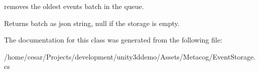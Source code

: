 removes the oldest events batch in the queue. 

\begin{DoxyReturn}{Returns}
batch as json string, null if the storage is empty.
\end{DoxyReturn}


The documentation for this class was generated from the following file\+:\begin{DoxyCompactItemize}
\item 
/home/cesar/\+Projects/development/unity3ddemo/\+Assets/\+Metacog/Event\+Storage.\+cs\end{DoxyCompactItemize}
